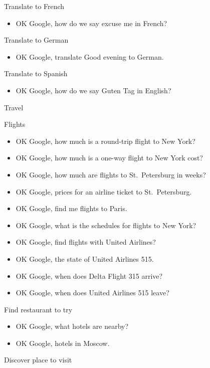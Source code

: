 \documentclass[
  a4paper,
]{article}
\providecommand{\tightlist}{%
  \setlength{\itemsep}{0pt}\setlength{\parskip}{0pt}}\usepackage{longtable,booktabs,array}
\begin{document}
Translate to French

\begin{itemize}
\tightlist
\item
  OK Google, how do we say excuse me in French?
\end{itemize}

Translate to German

\begin{itemize}
\tightlist
\item
  OK Google, translate Good evening to German.
\end{itemize}

Translate to Spanish

\begin{itemize}
\tightlist
\item
  OK Google, how do we say Guten Tag in English?
\end{itemize}

Travel

Flights

\begin{itemize}
\item
  OK Google, how much is a round-trip flight to New York?
\item
  OK Google, how much is a one-way flight to New York cost?
\item
  OK Google, how much are flights to St.~Petersburg in weeks?
\item
  OK Google, prices for an airline ticket to St.~Petersburg.
\item
  OK Google, find me flights to Paris.
\item
  OK Google, what is the schedules for flights to New York?
\item
  OK Google, find flights with United Airlines?
\item
  OK Google, the state of United Airlines 515.
\item
  OK Google, when does Delta Flight 315 arrive?
\item
  OK Google, when does United Airlines 515 leave?
\end{itemize}

Find restaurant to try

\begin{itemize}
\item
  OK Google, what hotels are nearby?
\item
  OK Google, hotels in Moscow.
\end{itemize}

Discover place to visit
\end{document}
